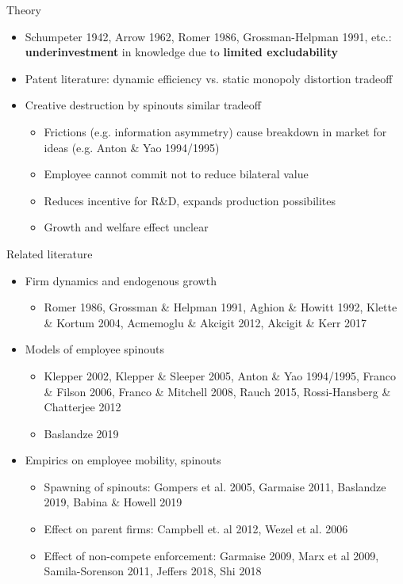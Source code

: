 \documentclass[english,usenames,dvipsnames]{beamer}
\begin{document}
\begin{frame}{Theory}
\label{theory_big_picture}
\begin{itemize}
\item Schumpeter 1942, Arrow 1962, Romer 1986, Grossman-Helpman 1991, etc.: \textbf{\alert{underinvestment}} in knowledge due to \textbf{\alert{limited excludability}}
\item Patent literature: dynamic efficiency vs. static monopoly distortion tradeoff
\item Creative destruction by spinouts similar tradeoff
\begin{itemize}
\item Frictions (e.g. information asymmetry) cause breakdown in market for ideas (e.g. Anton \& Yao 1994/1995)
\item Employee cannot commit not to reduce bilateral value
\item Reduces incentive for R\&D, expands production possibilites
\item Growth and welfare effect unclear
\end{itemize}
\end{itemize}
\end{frame}

\begin{frame}{Related literature}
\begin{itemize}
\item Firm dynamics and endogenous growth
\begin{itemize}
\item Romer 1986, Grossman \& Helpman 1991, Aghion \& Howitt 1992, Klette \& Kortum 2004, Acmemoglu \& Akcigit 2012, Akcigit \& Kerr 2017
\end{itemize}
\item Models of employee spinouts
\begin{itemize}
\item Klepper 2002, Klepper \& Sleeper 2005, Anton \& Yao 1994/1995, Franco \& Filson 2006, Franco \& Mitchell 2008, Rauch 2015, Rossi-Hansberg \& Chatterjee 2012
\item Baslandze 2019
\end{itemize}
\item Empirics on employee mobility, spinouts
\begin{itemize}
\item Spawning of spinouts: Gompers et al. 2005, Garmaise 2011, Baslandze 2019, Babina \& Howell 2019
\item Effect on parent firms: Campbell et. al 2012, Wezel et al. 2006
\item Effect of non-compete enforcement: Garmaise 2009, Marx et al 2009, Samila-Sorenson 2011, Jeffers 2018, Shi 2018
\end{itemize}
\end{itemize}
\end{frame}
\end{document}
